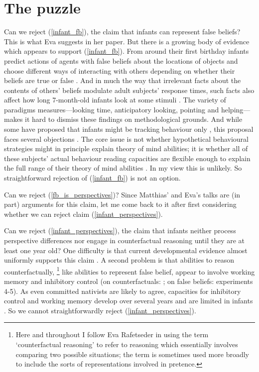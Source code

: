 \documentclass[12pt,\papersize]{extarticle}
\begin{document}
\section{The puzzle}
Can we reject (\ref{infant_fb}), the claim that infants can represent false beliefs?  
This is what  Eva suggests in her paper.
But there is a growing body of evidence which appears to support  (\ref{infant_fb}).
From around their first birthday infants  predict actions of agents with false beliefs about the locations of objects \citep[]{en_1092, en_1208} and choose different ways of interacting with others depending on whether their beliefs are true or false \citep[]{en_1783,Knudsen:2011fk,southgate:2010fb}.  
And in much the way that irrelevant facts about the contents of others’ beliefs modulate adult subjects’ response times, such facts also affect how long 7-month-old infants look at some stimuli \citep[]{en_1821}.
The variety of paradigms measures---looking time, anticipatory looking, pointing and helping---makes it hard to dismiss these findings on methodological grounds.
And while some have proposed that infants might be tracking behaviour only \citet{en_1168, en_1169},
this proposal faces several objections \citep[e.g.][]{Song:2008qo}.
The core issue is not whether hypothetical behavioural strategies might in principle explain theory of mind abilities; it is whether all of these subjects’ actual behaviour reading capacities are flexible enough to explain the full range of their theory of mind abilities \citep[]{en_1686}.
In my view this is unlikely.
So straightforward rejection of  (\ref{infant_fb}) is not an option.

Can we reject (\ref{fb_is_perspectives})?
Since Matthias' and Eva's talks are (in part) arguments for this claim, let me come back to it after first considering whether we can reject 
claim (\ref{infant_perspectives}).

Can we reject (\ref{infant_perspectives}), the claim that infants neither process perspective differences nor engage in counterfactual reasoning until they are at least one year old?
One difficulty is that current developmental evidence almost uniformly supports this claim  \citep{rafetseder:2010_counterfactual,beck:2011_almost}.
A second problem is that  abilities to reason counterfactually,%
\footnote{Here and throughout I follow Eva Rafetseder in using the term `counterfactual reasoning'  to refer to reasoning which essentially involves comparing two possible situations; the term is sometimes used more broadly to include the sorts of representations involved in pretence.} 
like abilities to represent false belief,
appear to involve working memory and inhibitory control 
(on counterfactuals: 
	\citealp{drayton:2011_counterfactual,beck:2011_supporting};
on false beliefs: \citealp{en_1412, en_1698, lin:2010_reflexively, en_1547} experiments 4-5).
As even committed nativists are likely to agree, capacities for inhibitory control and working memory develop over several years and are limited in infants \citep[e.g.][]{carlson:2005_developmentally}.
So we cannot straightforwardly reject (\ref{infant_perspectives}).
\end{document}
